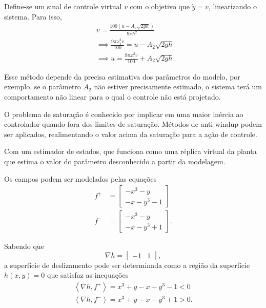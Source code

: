 \documentclass[a4paper]{report}
\begin{document}

Define-se um sinal de controle virtual $v$ com o objetivo que $\dot{y} = v$, linearizando o sistema. Para isso,
\begin{align*}
    &v = \frac{100\left( u - A_2\sqrt{2gh}  \right) }{9\pi h^2} \\
    &\implies \frac{9\pi x_1^2 v}{100} = u - A_2\sqrt{2gh} \\
    &\implies u = \frac{9\pi x_1^2 v}{100} + A_2\sqrt{2gh}
.\end{align*}


Esse método depende da precisa estimativa dos parâmetros do modelo, por exemplo, se o parâmetro $A_2$ não estiver precisamente estimado, o sistema terá um comportamento não linear para o qual o controle não está projetado.


O problema de saturação é conhecido por implicar em uma maior inércia ao controlador quando fora dos limites de saturação. Métodos de anti-windup podem ser aplicados, realimentando o valor acima da saturação para a ação de controle.


Com um estimador de estados, que funciona como uma réplica virtual da planta que estima o valor do parâmetro desconhecido a partir da modelagem.


Os campos podem ser modelados pelas equações
\begin{align*}
    f^{+} &= \begin{bmatrix} 
	-x^3 -y \\
	-x -y^3 -1
    \end{bmatrix} \\
    f^{-} &= \begin{bmatrix} 
	-x^3 -y \\
	-x -y^3 +1
    \end{bmatrix}
.\end{align*}

Sabendo que \[
    \nabla h = \begin{bmatrix} -1 & 1 \end{bmatrix} 
,\] a superfície de deslizamento pode ser determinada como a região da superfície $h(x,y) = 0$ que satisfaz as inequações
\begin{align*}
    \left< \nabla h, f^{+} \right> = x^3 + y -x -y^3 -1 <0 \\
    \left< \nabla h, f^{-} \right> = x^3 + y -x -y^3 +1 >0
.\end{align*}
\end{document}
